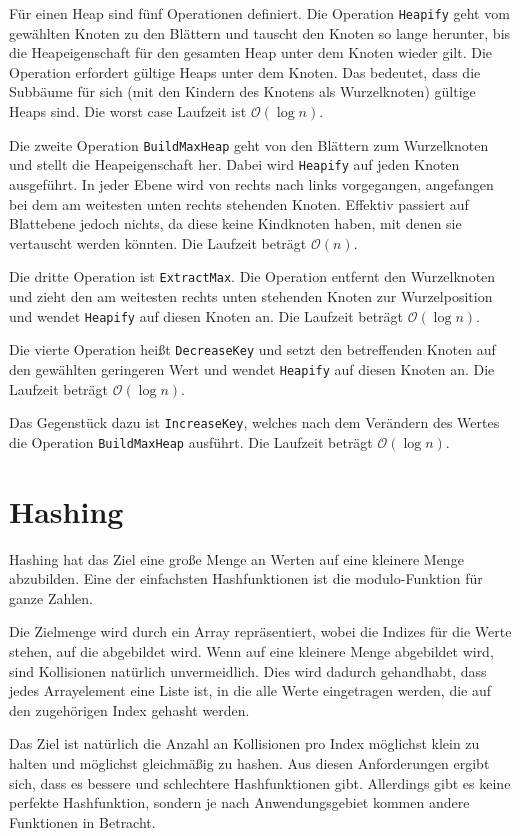\documentclass[10pt,a4paper,oneside,ngerman,numbers=noenddot]{scrartcl}
\begin{document}
		Für einen Heap sind fünf Operationen definiert. Die Operation \texttt{Heapify} geht vom gewählten Knoten zu den Blättern und tauscht den Knoten so lange herunter, bis die Heapeigenschaft für den gesamten Heap unter dem Knoten wieder gilt. Die Operation erfordert gültige Heaps unter dem Knoten. Das bedeutet, dass die Subbäume für sich (mit den Kindern des Knotens als Wurzelknoten) gültige Heaps sind. Die worst case Laufzeit ist $\mathcal{O}(\log n)$.
		
		Die zweite Operation \texttt{BuildMaxHeap} geht von den Blättern zum Wurzelknoten und stellt die Heapeigenschaft her. Dabei wird \texttt{Heapify} auf jeden Knoten ausgeführt. In jeder Ebene wird von rechts nach links vorgegangen, angefangen bei dem am weitesten unten rechts stehenden Knoten. Effektiv passiert auf Blattebene jedoch nichts, da diese keine Kindknoten haben, mit denen sie vertauscht werden könnten. Die Laufzeit beträgt $\mathcal{O}(n)$.
		
		Die dritte Operation ist \texttt{ExtractMax}. Die Operation entfernt den Wurzelknoten und zieht den am weitesten rechts unten stehenden Knoten zur Wurzelposition und wendet \texttt{Heapify} auf diesen Knoten an. Die Laufzeit beträgt $\mathcal{O}(\log n)$.
	
		Die vierte Operation heißt \texttt{DecreaseKey} und setzt den betreffenden Knoten auf den gewählten geringeren Wert und wendet \texttt{Heapify} auf diesen Knoten an. Die Laufzeit beträgt $\mathcal{O}(\log n)$.
		
		Das Gegenstück dazu ist \texttt{IncreaseKey}, welches nach dem Verändern des Wertes die Operation \texttt{BuildMaxHeap} ausführt. Die Laufzeit beträgt $\mathcal{O}(\log n)$.
		
\section{Hashing}

	Hashing hat das Ziel eine große Menge an Werten auf eine kleinere Menge abzubilden. Eine der einfachsten Hashfunktionen ist die modulo-Funktion für ganze Zahlen. 
	
	Die Zielmenge wird durch ein Array repräsentiert, wobei die Indizes für die Werte stehen, auf die abgebildet wird. Wenn auf eine kleinere Menge abgebildet wird, sind Kollisionen natürlich unvermeidlich. Dies wird dadurch gehandhabt, dass jedes Arrayelement eine Liste ist, in die alle Werte eingetragen werden, die auf den zugehörigen Index gehasht werden.
	
	Das Ziel ist natürlich die Anzahl an Kollisionen pro Index möglichst klein zu halten und möglichst gleichmäßig zu hashen. Aus diesen Anforderungen ergibt sich, dass es bessere und schlechtere Hashfunktionen gibt. Allerdings gibt es keine perfekte Hashfunktion, sondern je nach Anwendungsgebiet kommen andere Funktionen in Betracht.
	
\end{document}
